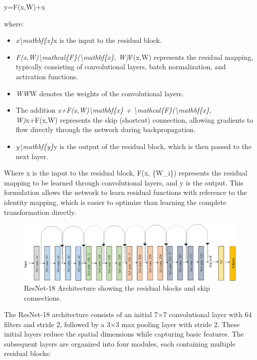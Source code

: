 \documentclass[
  twocolumn,
  10pt,
  a4paper,
  journal
]{IEEEtran}
\begin{document}
y=F(x,W)+x

where:

\begin{itemize}
\item
  \emph{x\textbackslash mathbf\{x\}}x is the input to the residual block.
\item
  \emph{F(x,W)\textbackslash mathcal\{F\}(\textbackslash mathbf\{x\}, W)}F(x,W) represents the residual mapping, typically consisting of convolutional layers, batch normalization, and activation functions.
\item
  \emph{WW}W denotes the weights of the convolutional layers.
\item
  The addition \emph{x+F(x,W)\textbackslash mathbf\{x\} + \textbackslash mathcal\{F\}(\textbackslash mathbf\{x\}, W)}x+F(x,W) represents the skip (shortcut) connection, allowing gradients to flow directly through the network during backpropagation.
\item
  \emph{y\textbackslash mathbf\{y\}}y is the output of the residual block, which is then passed to the next layer.
\end{itemize}

Where x is the input to the residual block, F(x, \{W\_i\}) represents the residual mapping to be learned through convolutional layers, and y is the output. This formulation allows the network to learn residual functions with reference to the identity mapping, which is easier to optimize than learning the complete transformation directly.

\begin{figure}[!t]
\centering
\includegraphics[width=\columnwidth]{figures/figure2.png}
\caption{ResNet-18 Architecture showing the residual blocks and skip connections.}
\label{fig:resnet18}
\end{figure}

The ResNet-18 architecture consists of an initial 7×7 convolutional layer with 64 filters and stride 2, followed by a 3×3 max pooling layer with stride 2. These initial layers reduce the spatial dimensions while capturing basic features. The subsequent layers are organized into four modules, each containing multiple residual blocks:
\end{document}
